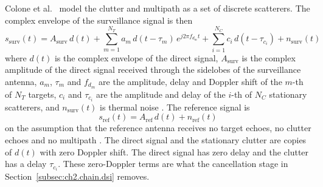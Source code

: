 Colone et al.\ \citep{colone2009} model the clutter and multipath as a set of discrete scatterers. The complex envelope of the surveillance signal is then
\begin{equation}
    s_{\mathrm{surv}}(t) = A_{\mathrm{surv}}\, d(t)
    + \sum_{m=1}^{N_T} a_m\, d(t - \tau_m)\, e^{j 2\pi f_{d_m} t}
    + \sum_{i=1}^{N_C} c_i\, d(t - \tau_{c_i})
    + n_{\mathrm{surv}}(t)
    \label{eq:surv-model}
\end{equation}
where $d(t)$ is the complex envelope of the direct signal, $A_{\mathrm{surv}}$ is the complex amplitude of the direct signal received through the sidelobes of the surveillance antenna, $a_m$, $\tau_m$ and $f_{d_m}$ are the amplitude, delay and Doppler shift of the $m$-th of $N_T$ targets, $c_i$ and $\tau_{c_i}$ are the amplitude and delay of the $i$-th of $N_C$ stationary scatterers, and $n_{\mathrm{surv}}(t)$ is thermal noise \citep{colone2009}. The reference signal is
\begin{equation}
    s_{\mathrm{ref}}(t) = A_{\mathrm{ref}}\, d(t) + n_{\mathrm{ref}}(t)
    \label{eq:ref-model}
\end{equation}
on the assumption that the reference antenna receives no target echoes, no clutter echoes and no multipath \citep{colone2009}. The direct signal and the stationary clutter are copies of $d(t)$ with zero Doppler shift. The direct signal has zero delay and the clutter has a delay $\tau_{c_i}$. These zero-Doppler terms are what the cancellation stage in Section~\ref{subsec:ch2.chain.dsi} removes.

